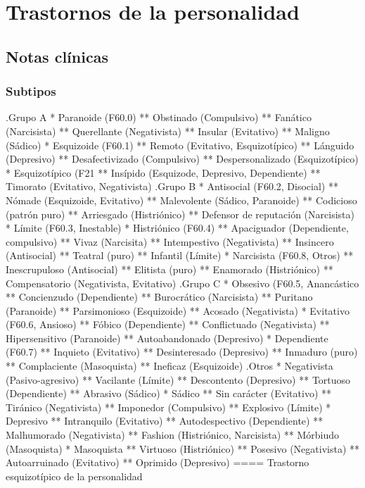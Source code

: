 \chapter{Trastornos de la personalidad}
\section*{Notas clínicas}
\subsection*{Subtipos}
.Grupo A
* Paranoide (F60.0)
** Obstinado (Compulsivo)
** Fanático (Narcisista)
** Querellante (Negativista)
** Insular (Evitativo)
** Maligno (Sádico)
* Esquizoide (F60.1)
** Remoto (Evitativo, Esquizotípico)
** Lánguido (Depresivo)
** Desafectivizado (Compulsivo)
** Despersonalizado (Esquizotípico)
* Esquizotípico (F21
** Insípido (Esquizode, Depresivo, Dependiente)
** Timorato (Evitativo, Negativista)
.Grupo B
* Antisocial (F60.2, Disocial)
** Nómade (Esquizoide, Evitativo)
** Malevolente (Sádico, Paranoide)
** Codicioso (patrón puro)
** Arriesgado (Histriónico)
** Defensor de reputación (Narcisista)
* Límite (F60.3, Inestable)
* Histriónico (F60.4)
** Apaciguador (Dependiente, compulsivo)
** Vivaz (Narcisita)
** Intempestivo (Negativista)
** Insincero (Antisocial)
** Teatral (puro)
** Infantil (Límite)
* Narcisista (F60.8, Otros)
** Inescrupuloso (Antisocial)
** Elitista (puro)
** Enamorado (Histriónico)
** Compensatorio (Negativista, Evitativo)
.Grupo C
* Obsesivo (F60.5, Anancástico
** Concienzudo (Dependiente)
** Burocrático (Narcisista)
** Puritano (Paranoide)
** Parsimonioso (Esquizoide)
** Acosado (Negativista)
* Evitativo (F60.6, Ansioso)
** Fóbico (Dependiente)
** Conflictuado (Negativista)
** Hipersensitivo (Paranoide)
** Autoabandonado (Depresivo)
* Dependiente (F60.7)
** Inquieto (Evitativo)
** Desinteresado (Depresivo)
** Inmaduro (puro)
** Complaciente (Masoquista)
** Ineficaz (Esquizoide)
.Otros
* Negativista (Pasivo-agresivo)
** Vacilante (Límite)
** Descontento (Depresivo)
** Tortuoso (Dependiente)
** Abrasivo (Sádico)
* Sádico
** Sin carácter (Evitativo)
** Tiránico (Negativista)
** Imponedor (Compulsivo)
** Explosivo (Límite)
* Depresivo
** Intranquilo (Evitativo)
** Autodespectivo (Dependiente)
** Malhumorado (Negativista)
** Fashion (Histriónico, Narcisista)
** Mórbiudo (Masoquista)
* Masoquista
** Virtuoso (Histriónico)
** Posesivo (Negativista)
** Autoarruinado (Evitativo)
** Oprimido (Depresivo)
==== Trastorno esquizotípico de la personalidad


